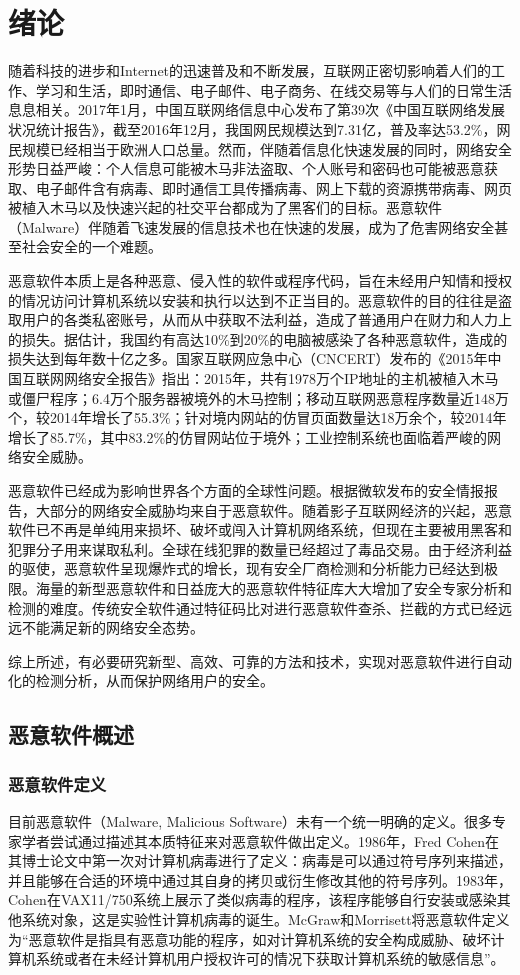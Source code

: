 \chapter{绪论}
随着科技的进步和Internet的迅速普及和不断发展，互联网正密切影响着人们的工作、学习和生活，即时通信、电子邮件、电子商务、在线交易等与人们的日常生活息息相关。2017年1月，中国互联网络信息中心发布了第39次《中国互联网络发展状况统计报告》，截至2016年12月，我国网民规模达到7.31亿，普及率达53.2\%，网民规模已经相当于欧洲人口总量\cite{cnnic2017report}。然而，伴随着信息化快速发展的同时，网络安全形势日益严峻：个人信息可能被木马非法盗取、个人账号和密码也可能被恶意获取、电子邮件含有病毒、即时通信工具传播病毒、网上下载的资源携带病毒、网页被植入木马以及快速兴起的社交平台都成为了黑客们的目标。恶意软件（Malware）伴随着飞速发展的信息技术也在快速的发展，成为了危害网络安全甚至社会安全的一个难题。

恶意软件本质上是各种恶意、侵入性的软件或程序代码，旨在未经用户知情和授权的情况访问计算机系统以安装和执行以达到不正当目的。恶意软件的目的往往是盗取用户的各类私密账号，从而从中获取不法利益，造成了普通用户在财力和人力上的损失。据估计，我国约有高达10\%到20\%的电脑被感染了各种恶意软件，造成的损失达到每年数十亿之多。国家互联网应急中心（CNCERT）发布的《2015年中国互联网网络安全报告》\cite{cncert2016report}指出：2015年，共有1978万个IP地址的主机被植入木马或僵尸程序；6.4万个服务器被境外的木马控制；移动互联网恶意程序数量近148万个，较2014年增长了55.3\%；针对境内网站的仿冒页面数量达18万余个，较2014年增长了85.7\%，其中83.2\%的仿冒网站位于境外；工业控制系统也面临着严峻的网络安全威胁。

恶意软件已经成为影响世界各个方面的全球性问题。根据微软发布的安全情报报告，大部分的网络安全威胁均来自于恶意软件。随着影子互联网经济的兴起，恶意软件已不再是单纯用来损坏、破坏或闯入计算机网络系统，但现在主要被用黑客和犯罪分子用来谋取私利。全球在线犯罪的数量已经超过了毒品交易。由于经济利益的驱使，恶意软件呈现爆炸式的增长，现有安全厂商检测和分析能力已经达到极限。海量的新型恶意软件和日益庞大的恶意软件特征库大大增加了安全专家分析和检测的难度。传统安全软件通过特征码比对进行恶意软件查杀、拦截的方式已经远远不能满足新的网络安全态势。

综上所述，有必要研究新型、高效、可靠的方法和技术，实现对恶意软件进行自动化的检测分析，从而保护网络用户的安全。
\section{恶意软件概述}
\subsection{恶意软件定义}
目前恶意软件（Malware, Malicious Software）未有一个统一明确的定义。很多专家学者尝试通过描述其本质特征来对恶意软件做出定义。1986年，Fred Cohen在其博士论文中第一次对计算机病毒进行了定义\cite{cohen1985computer}：病毒是可以通过符号序列来描述，并且能够在合适的环境中通过其自身的拷贝或衍生修改其他的符号序列。1983年，Cohen在VAX11/750系统上展示了类似病毒的程序，该程序能够自行安装或感染其他系统对象，这是实验性计算机病毒的诞生。McGraw和Morrisett\cite{mcgraw2000attacking}将恶意软件定义为``恶意软件是指具有恶意功能的程序，如对计算机系统的安全构成威胁、破坏计算机系统或者在未经计算机用户授权许可的情况下获取计算机系统的敏感信息''。
